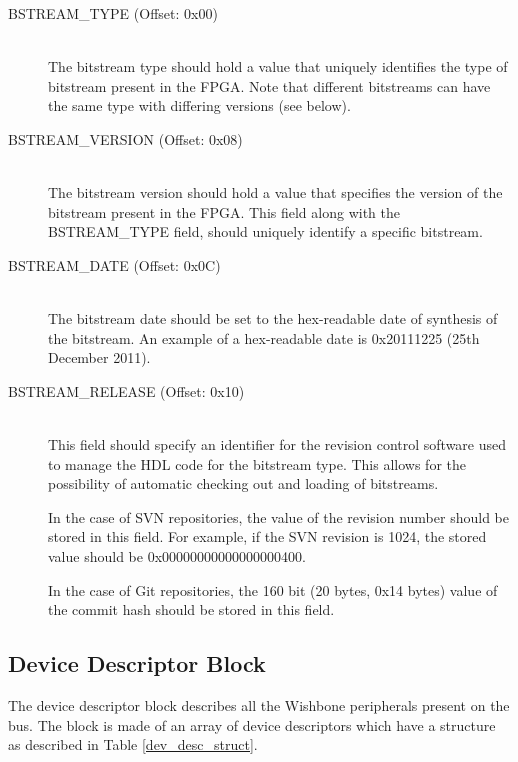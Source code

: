 \documentclass{article}
\begin{document}
\begin{description}
\item[BSTREAM\_TYPE (Offset: 0x00)] \hfill \\
The bitstream type should hold a value that uniquely identifies the type of 
bitstream present in the FPGA. Note that different bitstreams can have the
same type with differing versions (see below).

\item[BSTREAM\_VERSION (Offset: 0x08)] \hfill \\
The bitstream version should hold a value that specifies the version of the
bitstream present in the FPGA. This field along with the BSTREAM\_TYPE field,
should uniquely identify a specific bitstream.

\item[BSTREAM\_DATE (Offset: 0x0C)] \hfill \\
The bitstream date should be set to the hex-readable date of synthesis of
the bitstream. An example of a hex-readable date is 0x20111225 (25th December
2011).

\item[BSTREAM\_RELEASE (Offset: 0x10)] \hfill \\
This field should specify an identifier for the revision control software
used to manage the HDL code for the bitstream type. This allows for the 
possibility of automatic checking out and loading of bitstreams.

In the case of SVN repositories, the value of the revision number should
be stored in this field. For example, if the SVN revision is 1024, the 
stored value should be 0x00000000000000000400.

In the case of Git repositories, the 160 bit (20 bytes, 0x14 bytes) value
of the commit hash should be stored in this field.

\end{description}

\subsection{Device Descriptor Block}\label{device_block}

The device descriptor block describes all the Wishbone peripherals present
on the bus. The block is made of an array of device descriptors which have
a structure as described in Table \ref{dev_desc_struct}.
\end{document}
